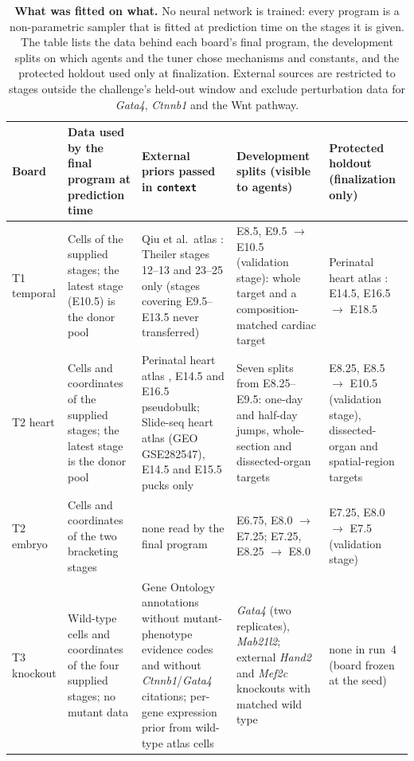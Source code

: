 \documentclass[9pt,twocolumn,a4paper]{extarticle}
\newcommand{\code}[1]{\texttt{\small #1}}
\begin{document}
\begin{table}[t]
\caption{\textbf{What was fitted on what.} No neural network is trained: every program is a non-parametric sampler
that is fitted at prediction time on the stages it is given. The table lists the data behind each board's final
program, the development splits on which agents and the tuner chose mechanisms and constants, and the protected
holdout used only at finalization. External sources are restricted to stages outside the challenge's held-out window
and exclude perturbation data for \emph{Gata4}, \emph{Ctnnb1} and the Wnt pathway.}
\label{tab:data}
\sffamily\fontsize{7.2}{9}\selectfont
\begin{tabularx}{\textwidth}{@{}L{1.3cm}L{3.9cm}L{4.3cm}L{4.1cm}Y@{}}
\toprule
\textbf{Board} & \textbf{Data used by the final program at prediction time} & \textbf{External priors passed in
\code{context}} & \textbf{Development splits (visible to agents)} & \textbf{Protected holdout (finalization only)} \\
\midrule
T1 temporal & Cells of the supplied stages; the latest stage (E10.5) is the donor pool &
Qiu et al.\ atlas \cite{qiu2024timelapse}: Theiler stages 12--13 and 23--25 only (stages covering E9.5--E13.5 never
transferred) &
E8.5, E9.5 $\rightarrow$ E10.5 (validation stage): whole target and a composition-matched cardiac target &
Perinatal heart atlas \cite{feulner2024}: E14.5, E16.5 $\rightarrow$ E18.5 \\
T2 heart & Cells and coordinates of the supplied stages; the latest stage is the donor pool &
Perinatal heart atlas \cite{feulner2024}, E14.5 and E16.5 pseudobulk; Slide-seq heart atlas (GEO GSE282547), E14.5 and
E15.5 pucks only &
Seven splits from E8.25--E9.5: one-day and half-day jumps, whole-section and dissected-organ targets &
E8.25, E8.5 $\rightarrow$ E10.5 (validation stage), dissected-organ and spatial-region targets \\
T2 embryo & Cells and coordinates of the two bracketing stages & none read by the final program &
E6.75, E8.0 $\rightarrow$ E7.25; E7.25, E8.25 $\rightarrow$ E8.0 &
E7.25, E8.0 $\rightarrow$ E7.5 (validation stage) \\
T3 knockout & Wild-type cells and coordinates of the four supplied stages; no mutant data &
Gene Ontology annotations \cite{ashburner2000go} without mutant-phenotype evidence codes and without
\emph{Ctnnb1}/\emph{Gata4} citations; per-gene expression prior from wild-type atlas cells \cite{qiu2024timelapse} &
\emph{Gata4} (two replicates), \emph{Mab21l2}; external \emph{Hand2} \cite{desoysa2019} and \emph{Mef2c}
\cite{muncievasic2025} knockouts with matched wild type &
none in run~4 (board frozen at the seed) \\
\bottomrule
\end{tabularx}
\end{table}
\end{document}
